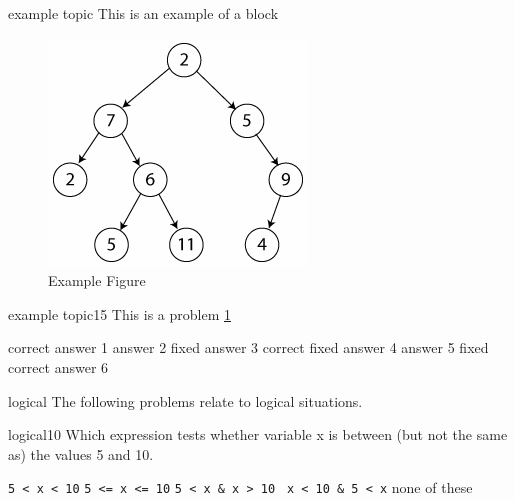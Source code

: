 \documentclass{exam}
\begin{document}

\begin{block}{example topic}
  This is an example of a block
\end{block}

\begin{figure}[placement h]
  \begin{center}
      \includegraphics[scale=0.50]{binary_tree.png}
      \caption{Example Figure}
      \label{fig:example topic}
   \end{center}
\end{figure}

\begin{problem}[require=example topic]{example topic}{15}
  This is a problem
  \ref{fig:example topic}
  \begin{answers}
    \answer[correct] correct answer 1
    \answer answer 2
    \answer[fixed] fixed answer 3
     correct fixed answer 4
    \answer answer 5
     fixed correct answer 6
  \end{answers}
\end{problem}

\begin{block}{logical}
The following problems relate to logical situations.
\end{block}

\begin{problem}[requires=logical]{logical}{10} 
  Which expression tests whether
  variable x is between (but not the same as) the values 5 and 10.
  \begin{answers}
    \answer \verb+5 < x < 10+
    \answer \verb+5 <= x <= 10+
    \answer \verb+5 < x & x > 10 +
    \answer[correct] \verb+x < 10 & 5 < x+ %
    \answer[fixed] none of these  %
  \end{answers}
\end{problem}
\end{document}

